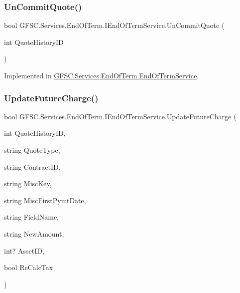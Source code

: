 \subsubsection{\texorpdfstring{Un\+Commit\+Quote()}{UnCommitQuote()}}
{\footnotesize\ttfamily bool G\+F\+S\+C.\+Services.\+End\+Of\+Term.\+I\+End\+Of\+Term\+Service.\+Un\+Commit\+Quote (\begin{DoxyParamCaption}\item[{int}]{Quote\+History\+ID }\end{DoxyParamCaption})}



Implemented in \mbox{\hyperlink{class_g_f_s_c_1_1_services_1_1_end_of_term_1_1_end_of_term_service_a5b4aae2fc91d5d76873fa5fad53ce4e2}{G\+F\+S\+C.\+Services.\+End\+Of\+Term.\+End\+Of\+Term\+Service}}.

\mbox{\label{interface_g_f_s_c_1_1_services_1_1_end_of_term_1_1_i_end_of_term_service_ac77b6e06f13fe19ff8d6eafc169f2132}} 
\subsubsection{\texorpdfstring{Update\+Future\+Charge()}{UpdateFutureCharge()}}
{\footnotesize\ttfamily bool G\+F\+S\+C.\+Services.\+End\+Of\+Term.\+I\+End\+Of\+Term\+Service.\+Update\+Future\+Charge (\begin{DoxyParamCaption}\item[{int}]{Quote\+History\+ID,  }\item[{string}]{Quote\+Type,  }\item[{string}]{Contract\+ID,  }\item[{string}]{Misc\+Key,  }\item[{string}]{Misc\+First\+Pymt\+Date,  }\item[{string}]{Field\+Name,  }\item[{string}]{New\+Amount,  }\item[{int?}]{Asset\+ID,  }\item[{bool}]{Re\+Calc\+Tax }\end{DoxyParamCaption})}



